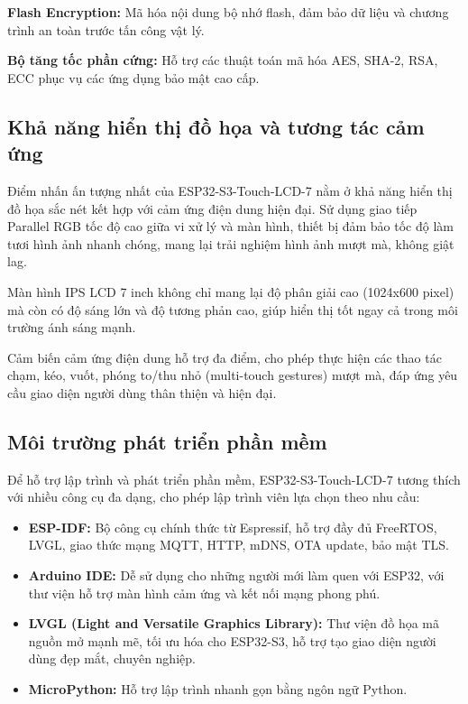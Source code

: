 \textbf{Flash Encryption:} Mã hóa nội dung bộ nhớ flash, đảm bảo dữ liệu và chương trình an toàn trước tấn công vật lý.

\textbf{Bộ tăng tốc phần cứng:} Hỗ trợ các thuật toán mã hóa AES, SHA-2, RSA, ECC phục vụ các ứng dụng bảo mật cao cấp.

\subsection{Khả năng hiển thị đồ họa và tương tác cảm ứng}
\tab Điểm nhấn ấn tượng nhất của ESP32-S3-Touch-LCD-7 nằm ở khả năng hiển thị đồ họa sắc nét kết hợp với cảm ứng điện dung hiện đại. Sử dụng giao tiếp Parallel RGB tốc độ cao giữa vi xử lý và màn hình, thiết bị đảm bảo tốc độ làm tươi hình ảnh nhanh chóng, mang lại trải nghiệm hình ảnh mượt mà, không giật lag.

\tab Màn hình IPS LCD 7 inch không chỉ mang lại độ phân giải cao (1024x600 pixel) mà còn có độ sáng lớn và độ tương phản cao, giúp hiển thị tốt ngay cả trong môi trường ánh sáng mạnh.

\tab Cảm biến cảm ứng điện dung hỗ trợ đa điểm, cho phép thực hiện các thao tác chạm, kéo, vuốt, phóng to/thu nhỏ (multi-touch gestures) mượt mà, đáp ứng yêu cầu giao diện người dùng thân thiện và hiện đại.


\subsection{Môi trường phát triển phần mềm}
\tab Để hỗ trợ lập trình và phát triển phần mềm, ESP32-S3-Touch-LCD-7 tương thích với nhiều công cụ đa dạng, cho phép lập trình viên lựa chọn theo nhu cầu:

\begin{itemize} 
  \item \textbf{ESP-IDF:} Bộ công cụ chính thức từ Espressif, hỗ trợ đầy đủ FreeRTOS, LVGL, giao thức mạng MQTT, HTTP, mDNS, OTA update, bảo mật TLS. 
  \item \textbf{Arduino IDE:} Dễ sử dụng cho những người mới làm quen với ESP32, với thư viện hỗ trợ màn hình cảm ứng và kết nối mạng phong phú. 
  \item \textbf{LVGL (Light and Versatile Graphics Library):} Thư viện đồ họa mã nguồn mở mạnh mẽ, tối ưu hóa cho ESP32-S3, hỗ trợ tạo giao diện người dùng đẹp mắt, chuyên nghiệp. 
  \item \textbf{MicroPython:} Hỗ trợ lập trình nhanh gọn bằng ngôn ngữ Python. 
\end{itemize}

